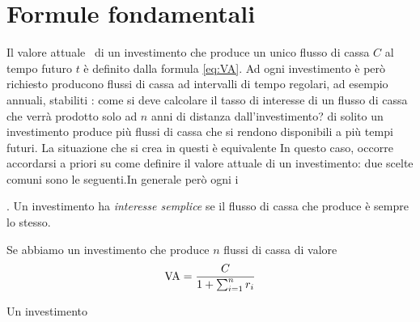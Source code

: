 \chapter{Formule fondamentali}
\label{chap:Formule_fondamentali}

Il valore attuale \VA\ di un investimento che produce un unico flusso di cassa
$C$ al tempo futuro $t$ è definito dalla formula \eqref{eq:VA}. Ad ogni investimento
è però richiesto producono flussi di cassa ad intervalli di tempo regolari, ad esempio annuali, stabiliti
: come si deve calcolare
il tasso di interesse di un flusso di cassa che verrà prodotto solo ad $n$ anni di distanza
dall'investimento? di solito un investimento produce più
flussi di cassa che si rendono disponibili a più tempi futuri.
La situazione che si crea in questi  è equivalente 
In questo caso, occorre accordarsi a priori su come definire il valore attuale
di un investimento: due scelte comuni sono le seguenti.In generale però ogni i
\begin{defn}. Un investimento ha \emph{interesse semplice} se il flusso di cassa
  che produce è sempre lo stesso.
\end{defn}
Se abbiamo un investimento che produce $n$ flussi di cassa di valore 
\begin{equation}
  \label{eq:i_semplice}
  \mathrm{VA}=\frac{C}{1+\sum_{i=1}^nr_i}
\end{equation}
\begin{defn}
  Un investimento 
\end{defn}


